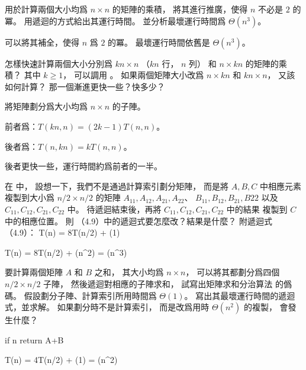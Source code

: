 \startsection[
  title={Multiplying square matrices},
]

\startEXERCISE
{} 用於計算兩個大小均爲 $n\times n$ 的矩陣的乘積，
將其進行推廣，使得 $n$ 不必是 $2$ 的冪。
用遞迴的方式給出其運行時間。
並分析最壞運行時間爲 $\Theta(n^3)$。
\stopEXERCISE

\startANSWER
可以將其補全，使得 $n$ 爲 $2$ 的冪。
最壞運行時間依舊是 $\Theta(n^3)$。
\stopANSWER

\startEXERCISE
怎樣快速計算兩個大小分別爲 $k n\times n$ （$kn$ 行， $n$ 列）
和 $n\times kn$ 的矩陣的乘積？
其中 $k\ge 1$，
可以調用 。
如果兩個矩陣大小改爲 $n\times kn$ 和 $kn\times n$，
又該如何計算？
那一個漸進更快一些？快多少？
\stopEXERCISE

\startANSWER
將矩陣劃分爲大小均爲 $n\times n$ 的子陣。

前者爲：$T(kn,n) = (2k-1)T(n,n)$。

後者爲：$T(n,kn) = k T(n,n)$。

後者更快一些，運行時間約爲前者的一半。
\stopANSWER

\startEXERCISE
在  中，
設想一下，我們不是通過計算索引劃分矩陣，
而是將 $A,B,C$ 中相應元素複製到大小爲 $n/2\times n/2$ 的矩陣
$A_{11},A_{12},A_{21},A_{22}$、 $B_{11},B_{12},B_{21},B{22}$
以及 $C_{11},C_{12},C_{21},C_{22}$ 中。
待遞迴結束後，再將 $C_{11},C_{12},C_{21},C_{22}$ 中的結果
複製到 $C$ 中的相應位置。
則 （4.9）中的遞迴式要怎麼改？結果是什麼？
附遞迴式（4.9）：
\startformula
T(n) = 8T(n/2) + \Theta(1)
\stopformula
\stopEXERCISE

\startANSWER
\startsplitformula\startmathalignment
\NC T(n) \NC = 8T(n/2) + \Theta(n^2) \NR
\NC \NC = \Theta(n^3) \NR
\stopmathalignment\stopsplitformula
\stopANSWER

\startEXERCISE
要計算兩個矩陣 $A$ 和 $B$ 之和，
其大小均爲 $n\times n$，
可以將其都劃分爲四個 $n/2\times n/2$ 子陣，
然後遞迴對相應的子陣求和，
試寫出矩陣求和分治算法  的僞碼。
假設劃分子陣、計算索引所用時間爲 $\Theta(1)$。
寫出其最壞運行時間的遞迴式，並求解。
如果劃分時不是計算索引，
而是改爲用時 $\Theta(n^2)$ 的複製，
會發生什麼？
\stopEXERCISE

\startANSWER
{}
\startCLRSCODE
if n 
	return A+B
\stopCLRSCODE

\startsplitformula\startmathalignment
\NC T(n) \NC = 4T(n/2) + \Theta(1) \NR
\NC \NC = \Theta(n^2) \NR
\stopmathalignment\stopsplitformula
\stopANSWER

\stopsection
